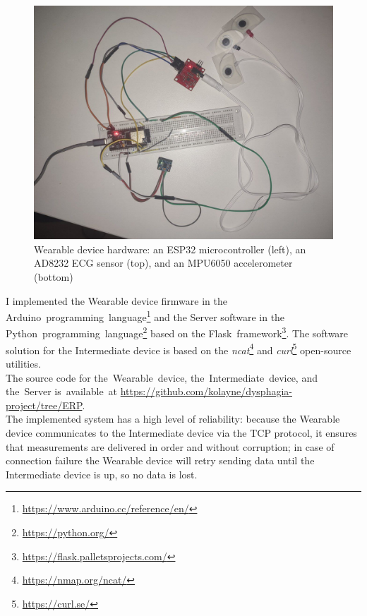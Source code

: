 \documentclass[lettersize,journal]{IEEEtran}
\begin{document}
\begin{figure}
    \centering
    \includegraphics[width=1\linewidth]{Images/hardware.jpg}
    \caption{Wearable device hardware: an ESP32 microcontroller (left), an AD8232 ECG sensor (top), and an MPU6050 accelerometer (bottom)}
\end{figure}

I implemented the Wearable device firmware in the
Arduino~programming~language\footnote{\url{https://www.arduino.cc/reference/en/}} and
the Server software in the Python~programming~language\footnote{\url{https://python.org/}}
based on the
Flask~framework\footnote{\url{https://flask.palletsprojects.com/}}.
The software solution for the Intermediate device is based on the
\textit{ncat}\footnote{\url{https://nmap.org/ncat/}} and
\textit{curl}\footnote{\url{https://curl.se/}} open-source utilities.
\\

The source code for the~Wearable~device, the~Intermediate~device, and the~Server
is~available~at
\url{https://github.com/kolayne/dysphagia-project/tree/ERP}.
\\

The implemented system has a high level of reliability: because the Wearable device
communicates to the Intermediate device via the TCP protocol, it ensures that measurements
are delivered in order and without corruption; in case of connection failure the Wearable
device will retry sending data until the Intermediate device is up, so no data is lost.
\end{document}

